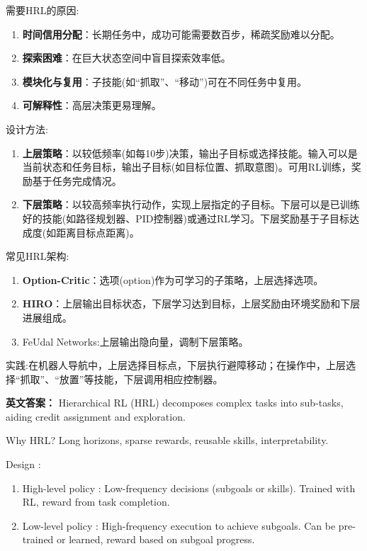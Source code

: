\documentclass[10pt,a4paper]{ctexart}
\begin{document}
 需要HRL的原因:
\begin{enumerate}
    \item \textbf{时间信用分配}：长期任务中，成功可能需要数百步，稀疏奖励难以分配。
    \item \textbf{探索困难}：在巨大状态空间中盲目探索效率低。
    \item \textbf{模块化与复用}：子技能(如“抓取”、“移动”)可在不同任务中复用。
    \item \textbf{可解释性}：高层决策更易理解。
\end{enumerate}

 设计方法:
\begin{enumerate}
    \item \textbf{上层策略}：以较低频率(如每10步)决策，输出子目标或选择技能。输入可以是当前状态和任务目标，输出子目标(如目标位置、抓取意图)。可用RL训练，奖励基于任务完成情况。
    \item \textbf{下层策略}：以较高频率执行动作，实现上层指定的子目标。下层可以是已训练好的技能(如路径规划器、PID控制器)或通过RL学习。下层奖励基于子目标达成度(如距离目标点距离)。
\end{enumerate}

 常见HRL架构:
\begin{enumerate}
    \item \textbf{Option-Critic}：选项(option)作为可学习的子策略，上层选择选项。
    \item \textbf{HIRO}：上层输出目标状态，下层学习达到目标，上层奖励由环境奖励和下层进展组成。
    \item FeUdal Networks:上层输出隐向量，调制下层策略。
\end{enumerate}

 实践:在机器人导航中，上层选择目标点，下层执行避障移动；在操作中，上层选择“抓取”、“放置”等技能，下层调用相应控制器。

\textbf{英文答案：}  
Hierarchical RL (HRL) decomposes complex tasks into sub-tasks, aiding credit assignment and exploration.

 Why HRL?  Long horizons, sparse rewards, reusable skills, interpretability.

 Design :
\begin{enumerate}
    \item High-level policy : Low-frequency decisions (subgoals or skills). Trained with RL, reward from task completion.
    \item Low-level policy : High-frequency execution to achieve subgoals. Can be pre-trained or learned, reward based on subgoal progress.
\end{enumerate}
\end{document}
